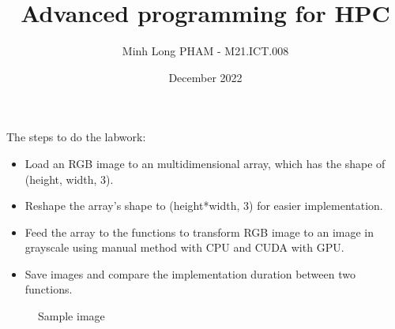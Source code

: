 \documentclass{article}
\title{Advanced programming for HPC}
\author{Minh Long PHAM - M21.ICT.008}
\date{December 2022}
\begin{document}
\maketitle

The steps to do the labwork:
\begin{itemize}
    \item Load an RGB image to an multidimensional array, which has the shape of (height, width, 3).
    \item Reshape the array's shape to (height*width, 3) for easier implementation.
    \item Feed the array to the functions to transform RGB image to an image in grayscale using manual method with CPU and CUDA with GPU.
    \item Save images and compare the implementation duration between two functions.
\end{itemize}

\begin{figure}[H]
    \caption{Sample image}
\end{figure}
\end{document}
